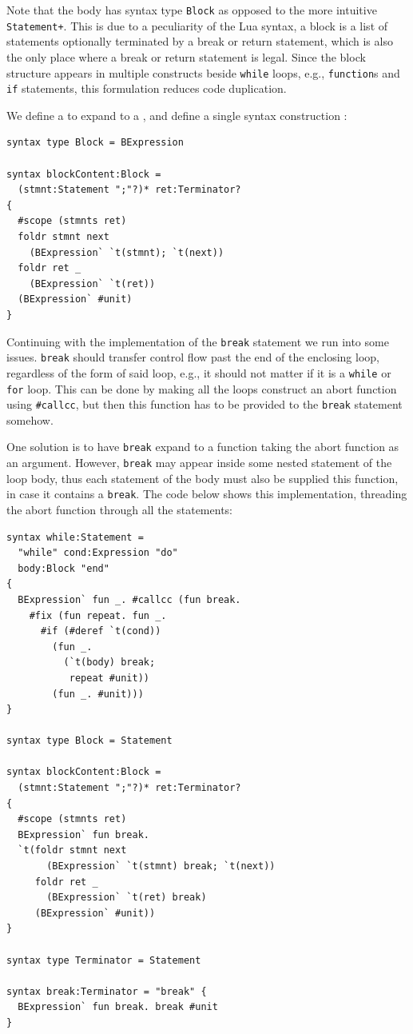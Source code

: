 \documentclass{kththesis}
\begin{document}
Note that the body has syntax type \texttt{Block} as opposed to the more intuitive \texttt{Statement+}. This is due to a peculiarity of the Lua syntax, a block is a list of statements optionally terminated by a break or return statement, which is also the only place where a break or return statement is legal. Since the block structure appears in multiple constructs beside \texttt{while} loops, e.g., \texttt{function}s and \texttt{if} statements, this formulation reduces code duplication.

We define a  to expand to a , and define a single syntax construction :

\begin{verbatim}
syntax type Block = BExpression

syntax blockContent:Block =
  (stmnt:Statement ";"?)* ret:Terminator?
{
  #scope (stmnts ret)
  foldr stmnt next
    (BExpression` `t(stmnt); `t(next))
  foldr ret _
    (BExpression` `t(ret))
  (BExpression` #unit)
}
\end{verbatim}

Continuing with the implementation of the \texttt{break} statement we run into some issues. \texttt{break} should transfer control flow past the end of the enclosing loop, regardless of the form of said loop, e.g., it should not matter if it is a \texttt{while} or \texttt{for} loop. This can be done by making all the loops construct an abort function using \texttt{#callcc}, but then this function has to be provided to the \texttt{break} statement somehow.

One solution is to have \texttt{break} expand to a function taking the abort function as an argument. However, \texttt{break} may appear inside some nested statement of the loop body, thus each statement of the body must also be supplied this function, in case it contains a \texttt{break}. The code below shows this implementation, threading the abort function through all the statements:

\begin{verbatim}
syntax while:Statement =
  "while" cond:Expression "do"
  body:Block "end"
{
  BExpression` fun _. #callcc (fun break.
    #fix (fun repeat. fun _.
      #if (#deref `t(cond))
        (fun _.
          (`t(body) break;
           repeat #unit))
        (fun _. #unit)))
}

syntax type Block = Statement

syntax blockContent:Block =
  (stmnt:Statement ";"?)* ret:Terminator?
{
  #scope (stmnts ret)
  BExpression` fun break.
  `t(foldr stmnt next
       (BExpression` `t(stmnt) break; `t(next))
     foldr ret _
       (BExpression` `t(ret) break)
     (BExpression` #unit))
}

syntax type Terminator = Statement

syntax break:Terminator = "break" {
  BExpression` fun break. break #unit
}
\end{verbatim}
\end{document}
